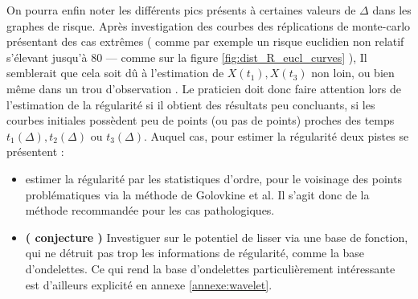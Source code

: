 \bigskip

On pourra enfin noter les différents pics présents à certaines valeurs de $\Delta$ dans les graphes de risque. Après investigation des courbes des réplications de monte-carlo présentant des cas extrêmes ( comme par exemple un risque euclidien non relatif s'élevant jusqu'à 80 — comme sur la figure \ref{fig:dist_R_eucl_curves} ), Il semblerait que cela soit dû à l'estimation de $X(t_1), X(t_3)$ non loin, ou bien même dans un \og trou d'observation \fg. Le praticien doit donc faire attention lors de l'estimation de la régularité si il obtient des résultats peu concluants, si les courbes initiales possèdent peu de points (ou pas de points) proches des temps $t_1(\Delta), t_2(\Delta)$ ou $t_3(\Delta)$. Auquel cas, pour estimer la régularité deux pistes se présentent :

\bigskip

\begin{itemize}
\item estimer la régularité par les statistiques d'ordre, pour le voisinage des points problématiques via la méthode de Golovkine et al. Il s'agit donc de la méthode recommandée pour les cas pathologiques. 

\bigskip

\item \textbf{( \faExclamationTriangle conjecture )} Investiguer sur le potentiel de lisser via une base de fonction, qui ne détruit pas trop les informations de régularité, comme la base d'ondelettes. Ce qui rend la base d'ondelettes particulièrement intéressante est d'ailleurs explicité en annexe \ref{annexe:wavelet}.
\end{itemize}

